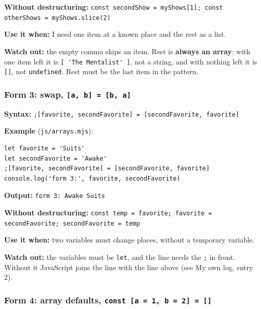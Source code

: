 \documentclass[
  10pt,
]{article}
\newcommand{\passthrough}[1]{#1}
\begin{document}
\textbf{Without destructuring:}
\passthrough{\lstinline!const secondShow = myShows[1]; const otherShows = myShows.slice(2)!}

\textbf{Use it when:} I need one item at a known place and the rest as a
list.

\textbf{Watch out:} the empty comma skips an item. Rest is
\textbf{always an array}: with one item left it is
\passthrough{\lstinline![ 'The Mentalist' ]!}, not a string, and with
nothing left it is \passthrough{\lstinline![]!}, not
\passthrough{\lstinline!undefined!}. Rest must be the last item in the
pattern.

\hypertarget{form-3-swap-a-b-b-a}{%
\subsubsection{\texorpdfstring{Form 3: swap,
\texttt{{[}a,\ b{]}\ =\ {[}b,\ a{]}}}{Form 3: swap, {[}a, b{]} = {[}b, a{]}}}\label{form-3-swap-a-b-b-a}}

\textbf{Syntax:}
\passthrough{\lstinline!;[favorite, secondFavorite] = [secondFavorite, favorite]!}

\textbf{Example} (\passthrough{\lstinline!js/arrays.mjs!}):

\begin{lstlisting}
let favorite = 'Suits'
let secondFavorite = 'Awake'
;[favorite, secondFavorite] = [secondFavorite, favorite]
console.log('form 3:', favorite, secondFavorite)
\end{lstlisting}

\textbf{Output:} \passthrough{\lstinline!form 3: Awake Suits!}

\textbf{Without destructuring:}
\passthrough{\lstinline!const temp = favorite; favorite = secondFavorite; secondFavorite = temp!}

\textbf{Use it when:} two variables must change places, without a
temporary variable.

\textbf{Watch out:} the variables must be \passthrough{\lstinline!let!},
and the line needs the \passthrough{\lstinline!;!} in front. Without it
JavaScript joins the line with the line above (see My own log, entry 2).

\hypertarget{form-4-array-defaults-const-a-1-b-2}{%
\subsubsection{\texorpdfstring{Form 4: array defaults,
\texttt{const\ {[}a\ =\ 1,\ b\ =\ 2{]}\ =\ {[}{]}}}{Form 4: array defaults, const {[}a = 1, b = 2{]} = {[}{]}}}\label{form-4-array-defaults-const-a-1-b-2}}
\end{document}
